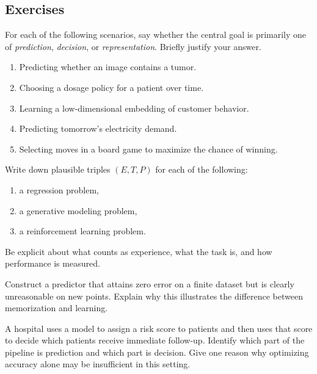 \subsection*{Exercises}

\begin{exercise}
For each of the following scenarios, say whether the central goal is primarily one of \emph{prediction}, \emph{decision}, or \emph{representation}. Briefly justify your answer.
\begin{enumerate}
    \item Predicting whether an image contains a tumor.
    \item Choosing a dosage policy for a patient over time.
    \item Learning a low-dimensional embedding of customer behavior.
    \item Predicting tomorrow's electricity demand.
    \item Selecting moves in a board game to maximize the chance of winning.
\end{enumerate}
\end{exercise}

\begin{exercise}
Write down plausible triples $(E,T,P)$ for each of the following:
\begin{enumerate}
    \item a regression problem,
    \item a generative modeling problem,
    \item a reinforcement learning problem.
\end{enumerate}
Be explicit about what counts as experience, what the task is, and how performance is measured.
\end{exercise}

\begin{exercise}
Construct a predictor that attains zero error on a finite dataset but is clearly unreasonable on new points. Explain why this illustrates the difference between memorization and learning.
\end{exercise}

\begin{exercise}
A hospital uses a model to assign a risk score to patients and then uses that score to decide which patients receive immediate follow-up. Identify which part of the pipeline is prediction and which part is decision. Give one reason why optimizing accuracy alone may be insufficient in this setting.
\end{exercise}

